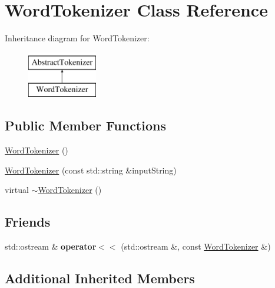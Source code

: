 \hypertarget{classWordTokenizer}{\section{Word\-Tokenizer Class Reference}
\label{classWordTokenizer}
}
Inheritance diagram for Word\-Tokenizer\-:\begin{figure}[H]
\begin{center}
\leavevmode
\includegraphics[height=2.000000cm]{classWordTokenizer}
\end{center}
\end{figure}
\subsection*{Public Member Functions}
\begin{DoxyCompactItemize}
\item 
\hyperlink{classWordTokenizer_a78cfc8455e2b0d99ae070a9d9ef647c8}{Word\-Tokenizer} ()
\item 
\hyperlink{classWordTokenizer_ab360e49e4fc162e48060c0811d4d19f8}{Word\-Tokenizer} (const std\-::string \&input\-String)
\item 
virtual \hyperlink{classWordTokenizer_a04c986b8527bd4f556443161804b1208}{$\sim$\-Word\-Tokenizer} ()
\end{DoxyCompactItemize}
\subsection*{Friends}
\begin{DoxyCompactItemize}
\item 
\hypertarget{classWordTokenizer_aa4996c7e6f7338a26da11ab4a0f15b78}{std\-::ostream \& {\bfseries operator$<$$<$} (std\-::ostream \&, const \hyperlink{classWordTokenizer}{Word\-Tokenizer} \&)}\label{classWordTokenizer_aa4996c7e6f7338a26da11ab4a0f15b78}

\end{DoxyCompactItemize}
\subsection*{Additional Inherited Members}


